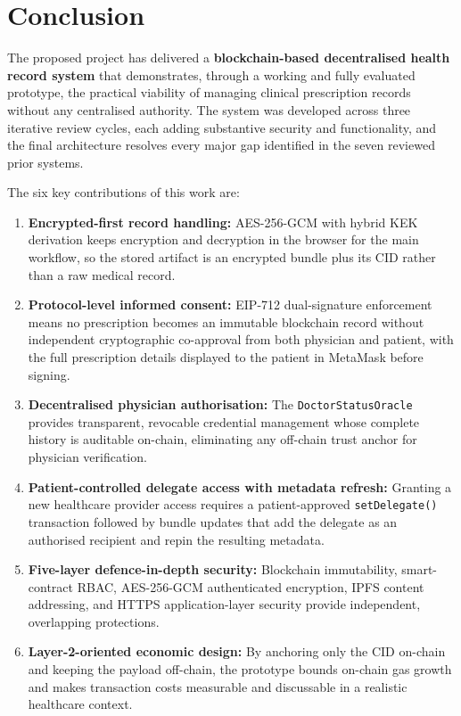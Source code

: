 \documentclass[12pt,a4wide]{report}
\begin{document}
\chapter{Conclusion}

The proposed project has delivered a \textbf{blockchain-based decentralised health record
system} that demonstrates, through a working and fully evaluated prototype, the
practical viability of managing clinical prescription records without any
centralised authority. The system was developed across three iterative review
cycles, each adding substantive security and functionality, and the final
architecture resolves every major gap identified in the seven reviewed prior systems.

The six key contributions of this work are:

\begin{enumerate}
  \item \textbf{Encrypted-first record handling:} AES-256-GCM with hybrid
    KEK derivation keeps encryption and decryption in the browser for the main
    workflow, so the stored artifact is an encrypted bundle plus its CID rather
    than a raw medical record.
  \item \textbf{Protocol-level informed consent:} EIP-712 dual-signature enforcement
    means no prescription becomes an immutable blockchain record without independent
    cryptographic co-approval from both physician and patient, with the full
    prescription details displayed to the patient in MetaMask before signing.
  \item \textbf{Decentralised physician authorisation:} The
    \texttt{DoctorStatusOracle} provides transparent, revocable credential
    management whose complete history is auditable on-chain, eliminating any
    off-chain trust anchor for physician verification.
  \item \textbf{Patient-controlled delegate access with metadata refresh:}
    Granting a new healthcare provider access requires a patient-approved
    \texttt{setDelegate()} transaction followed by bundle updates that add the
    delegate as an authorised recipient and repin the resulting metadata.
  \item \textbf{Five-layer defence-in-depth security:} Blockchain immutability,
    smart-contract RBAC, AES-256-GCM authenticated encryption, IPFS content
    addressing, and HTTPS application-layer security provide independent,
    overlapping protections.
  \item \textbf{Layer-2-oriented economic design:} By anchoring only the CID
    on-chain and keeping the payload off-chain, the prototype bounds on-chain
    gas growth and makes transaction costs measurable and discussable in a
    realistic healthcare context.
\end{enumerate}
\end{document}
